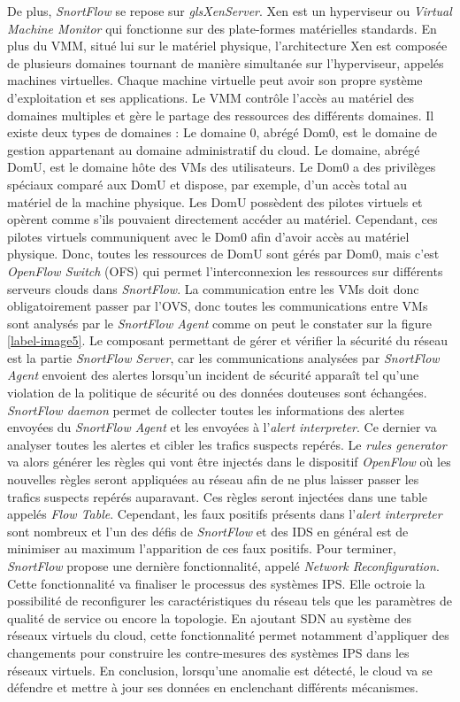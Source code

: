 De plus, \textit{SnortFlow} se repose sur \textit{gls{XenServer}}. Xen est un hyperviseur ou \textit{Virtual Machine Monitor} qui fonctionne sur des plate-formes matérielles standards. En plus du VMM, situé lui sur le matériel physique, l'architecture Xen est composée de plusieurs domaines tournant de manière simultanée sur l'hyperviseur, appelés machines virtuelles. Chaque machine virtuelle peut avoir son propre système d'exploitation et ses applications. Le VMM contrôle l'accès au matériel des domaines multiples et gère le partage des ressources des différents domaines. Il existe deux types de domaines :
Le domaine 0, abrégé Dom0, est le domaine de gestion appartenant au domaine administratif du cloud. Le domaine, abrégé DomU, est le domaine hôte des VMs des utilisateurs.
Le Dom0 a des privilèges spéciaux comparé aux DomU et dispose, par exemple, d'un accès total au matériel de la machine physique. Les DomU possèdent des pilotes virtuels et opèrent comme s'ils pouvaient directement accéder au matériel. Cependant, ces pilotes virtuels communiquent avec le Dom0 afin d'avoir accès au matériel physique.
Donc, toutes les ressources de DomU sont gérés par Dom0, mais c'est \textit{OpenFlow Switch} (OFS) qui permet l'interconnexion les ressources sur différents serveurs clouds dans \textit{SnortFlow}. La communication entre les VMs doit donc obligatoirement passer par l'OVS, donc toutes les communications entre VMs sont analysés par le \textit{SnortFlow Agent} comme on peut le constater sur la figure \ref{label-image5}.
Le composant permettant de gérer et vérifier la sécurité du réseau est la partie \textit{SnortFlow Server}, car les communications analysées par \textit{SnortFlow Agent}  envoient des alertes lorsqu'un incident de sécurité apparaît tel qu'une violation de la politique de sécurité ou des données douteuses sont échangées. \textit{SnortFlow daemon} permet de collecter toutes les informations des alertes envoyées du \textit{SnortFlow Agent} et les envoyées à l'\textit{alert interpreter}. Ce dernier va analyser toutes les alertes et cibler les trafics suspects repérés. Le \textit{rules generator} va alors générer les règles qui vont être injectés dans le dispositif \textit{OpenFlow} où les nouvelles règles seront appliquées au réseau afin de ne plus laisser passer les trafics suspects repérés auparavant. Ces règles seront injectées dans une table appelés \textit{Flow Table}. Cependant, les faux positifs présents dans l'\textit{alert interpreter} sont nombreux et l'un des défis de \textit{SnortFlow} et des IDS en général est de minimiser au maximum l'apparition de ces faux positifs. Pour terminer, \textit{SnortFlow} propose une dernière fonctionnalité, appelé \textit{Network Reconfiguration}. Cette fonctionnalité va finaliser le processus des systèmes IPS. Elle octroie la possibilité de reconfigurer les caractéristiques du réseau tels que les paramètres de qualité de service ou encore la topologie. En ajoutant SDN au système des réseaux virtuels du cloud, cette fonctionnalité permet notamment d'appliquer des changements pour construire les contre-mesures des systèmes IPS dans les réseaux virtuels. En conclusion, lorsqu'une anomalie est détecté, le cloud va se défendre et mettre à jour ses données en enclenchant différents mécanismes.

